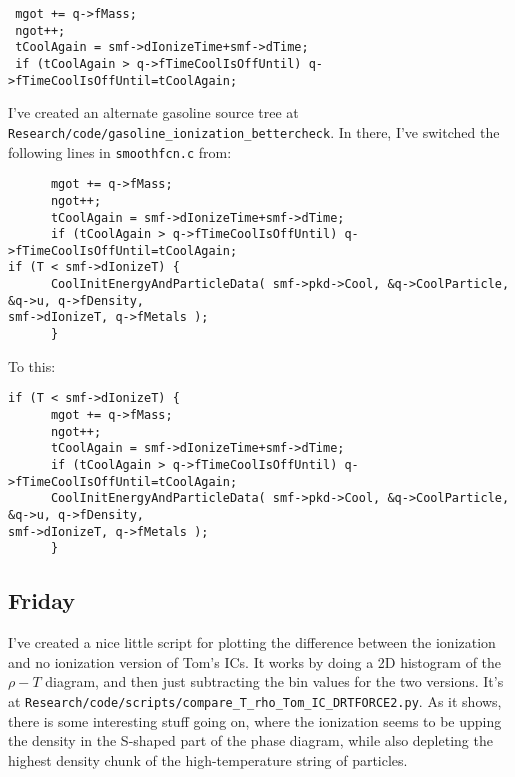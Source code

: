 \documentclass[11pt,letterpaper]{article}
\begin{document}
\begin{verbatim}
 mgot += q->fMass;
 ngot++;
 tCoolAgain = smf->dIonizeTime+smf->dTime;
 if (tCoolAgain > q->fTimeCoolIsOffUntil) q->fTimeCoolIsOffUntil=tCoolAgain;
\end{verbatim}

I've created an alternate gasoline source tree at
\verb!Research/code/gasoline_ionization_bettercheck!. In there, I've
switched the following lines in \verb!smoothfcn.c! from:

\begin{verbatim}
      mgot += q->fMass;
      ngot++;
      tCoolAgain = smf->dIonizeTime+smf->dTime;
      if (tCoolAgain > q->fTimeCoolIsOffUntil) q->fTimeCoolIsOffUntil=tCoolAgain;
if (T < smf->dIonizeT) {
      CoolInitEnergyAndParticleData( smf->pkd->Cool, &q->CoolParticle, &q->u, q->fDensity, 
smf->dIonizeT, q->fMetals );
      }
\end{verbatim}

To this:

\begin{verbatim}
if (T < smf->dIonizeT) {
      mgot += q->fMass;
      ngot++;
      tCoolAgain = smf->dIonizeTime+smf->dTime;
      if (tCoolAgain > q->fTimeCoolIsOffUntil) q->fTimeCoolIsOffUntil=tCoolAgain;
      CoolInitEnergyAndParticleData( smf->pkd->Cool, &q->CoolParticle, &q->u, q->fDensity, 
smf->dIonizeT, q->fMetals );
      }
\end{verbatim}

\subsection{Friday}

I've created a nice little script for plotting the difference between
the ionization and no ionization version of Tom's ICs. It works by doing
a 2D histogram of the $\rho-T$ diagram, and then just subtracting the
bin values for the two versions. It's at
\verb!Research/code/scripts/compare_T_rho_Tom_IC_DRTFORCE2.py!. As it
shows, there is some interesting stuff going on, where the ionization
seems to be upping the density in the S-shaped part of the phase
diagram, while also depleting the highest density chunk of the
high-temperature string of particles.
\end{document}
